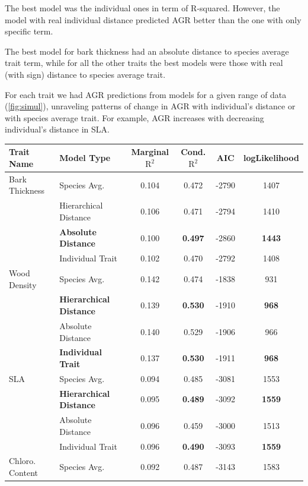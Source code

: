 The best model was the individual ones in term of R-squared. However, the model with real individual distance predicted AGR better than the one with only specific term.

The best model for bark thickness had an absolute distance to species average trait term, while for all the other traits the best models were those with real (with sign) distance to species average trait.

For each trait we had AGR predictions from models for a given range of data (\autoref{fig:simul}), unraveling patterns of change in AGR with individual's distance or with species average trait. For example, AGR increases with decreasing individual's distance in SLA.

\begin{table}[!t]
	\begin{center}
		\begin{tabular}{llcccc}
		  \hline
		  \hline
		 Trait Name & Model Type & Marginal $\text{R}^2$ & Cond. $\text{R}^2$ & AIC & logLikelihood \\ 
		  \hline
		Bark Thickness & Species Avg. & 0.104 & 0.472 & -2790 & 1407 \\ 
		            & Hierarchical Distance & 0.106 & 0.471 & -2794 & 1410 \\ 
		            & \textbf{Absolute Distance} & 0.100 & \textbf{0.497} & -2860 & \textbf{1443} \\ 
		            & Individual Trait & 0.102 & 0.470 & -2792 & 1408 \\ 
		  Wood Density & Species Avg. & 0.142 & 0.474 & -1838 & 931 \\ 
		               & \textbf{Hierarchical Distance} & 0.139 & \textbf{0.530} & -1910 & \textbf{968} \\ 
		               & Absolute Distance & 0.140 & 0.529 & -1906 & 966 \\ 
		               & \textbf{Individual Trait} & 0.137 & \textbf{0.530} & -1911 & \textbf{968} \\ 
		  SLA & Species Avg. & 0.094 & 0.485 & -3081 & 1553 \\ 
		      & \textbf{Hierarchical Distance} & 0.095 & \textbf{0.489} & -3092 & \textbf{1559} \\ 
		      & Absolute Distance & 0.096 & 0.459 & -3000 & 1513 \\ 
		      & Individual Trait & 0.096 & \textbf{0.490} & -3093 & \textbf{1559} \\ 
		  Chloro. Content & Species Avg. & 0.092 & 0.487 & -3143 & 1583 \\ 

\end{tabular}
\end{center}
\end{table}
